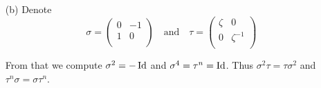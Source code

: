 \documentclass[12pt]{book}
\def\Id{\mathop{\rm Id}\nolimits}
\newcounter{myenumi}
\newenvironment{myenumerate}
{\begin{enumerate}
 \setcounter{enumi}{\themyenumi}
}
{\setcounter{myenumi}{\theenumi}
 \end{enumerate}}
\begin{document}
\begin{myenumerate}
\begin{itemize}
 \item[(b)]
  Denote
   \begin{equation}
     \sigma = \left(
      \begin{array}{lr}
       0 & -1 \\
       1 & 0 \\
      \end{array}
     \right)
     \quad\textrm{and}\quad
     \tau = \left(
      \begin{array}{lc}
       \zeta & 0 \\
       0 & \zeta^{-1} \\
      \end{array}
     \right)
   \end{equation}

  From that we compute \(\sigma^2 = -\Id\) and \(\sigma^4 = \tau^n = \Id\).
  Thus \(\sigma^2\tau=\tau\sigma^2\) and \(\tau^n\sigma=\sigma\tau^n\).
\end{itemize}

\iffalse
\begin{itemize}
  \item[(a)] Rotation and mirroring. Consider the subgroup of \(S_n\)
     where
   \begin{equation*}
     \sigma(i) =
       \left\{
         \begin{array}{ll}
         i + i \;& \textnormal{if}\; i < n \\
         0     \;& \textnormal{if}\; i = n
         \end{array}
       \right.
   \end{equation*}
   and \(\tau(i) = (n - i + 1)\).

  \item[(b)]
  Say $J$ is the first matrix. Then
  \begin{equation*}
    J^2 =
      \left(
        \begin{array}{rr}
        -1 & 0 \\
        0  & -1
        \end{array}
      \right)
     \quad\textrm{and}\quad
    J^3 =
      \left(
        \begin{array}{rr}
        0 & 1 \\
        -1 & 0
        \end{array}
      \right)
     \quad\textrm{and}\quad
    J^4 =
      \left(
        \begin{array}{rr}
        1 & 0 \\
        0 & 1
        \end{array}
      \right).
  \end{equation*}
\end{itemize}
\fi



\end{myenumerate}
\end{document}
